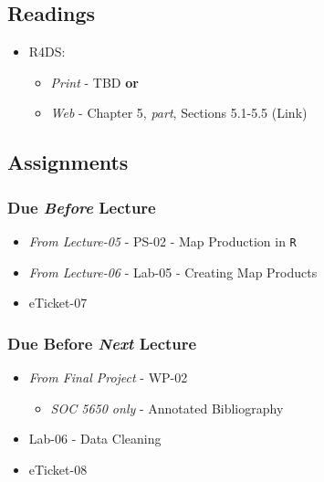 \documentclass[]{book}
\providecommand{\tightlist}{%
  \setlength{\itemsep}{0pt}\setlength{\parskip}{0pt}}
\begin{document}
\hypertarget{readings-8}{%
\subsection*{Readings}\label{readings-8}}

\begin{itemize}
\tightlist
\item
  R4DS:

  \begin{itemize}
  \tightlist
  \item
    \emph{Print} - TBD \textbf{or}
  \item
    \emph{Web} - Chapter 5, \emph{part}, Sections 5.1-5.5 (Link)
  \end{itemize}
\end{itemize}

\hypertarget{assignments-8}{%
\subsection*{Assignments}\label{assignments-8}}

\hypertarget{due-before-lecture-6}{%
\subsubsection*{\texorpdfstring{Due \emph{Before} Lecture}{Due Before Lecture}}\label{due-before-lecture-6}}

\begin{itemize}
\tightlist
\item
  \emph{From Lecture-05} - PS-02 - Map Production in \texttt{R}
\item
  \emph{From Lecture-06} - Lab-05 - Creating Map Products
\item
  eTicket-07
\end{itemize}

\hypertarget{due-before-next-lecture-5}{%
\subsubsection*{\texorpdfstring{Due Before \emph{Next} Lecture}{Due Before Next Lecture}}\label{due-before-next-lecture-5}}

\begin{itemize}
\tightlist
\item
  \emph{From Final Project} - WP-02

  \begin{itemize}
  \tightlist
  \item
    \emph{SOC 5650 only} - Annotated Bibliography
  \end{itemize}
\item
  Lab-06 - Data Cleaning
\item
  eTicket-08
\end{itemize}
\end{document}
